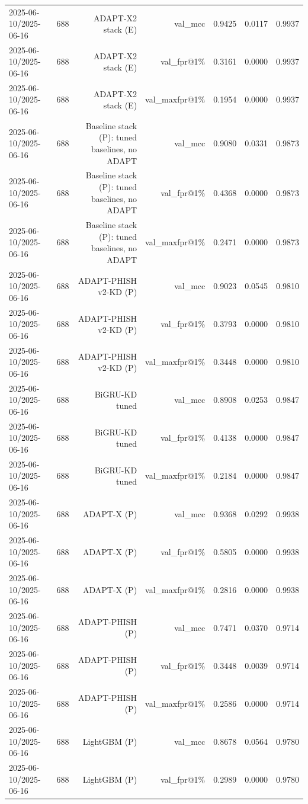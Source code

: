 \begin{table}[t]
\begin{tabular}{llrrrrr}
2025-06-10/2025-06-16 & 688 & ADAPT-X2 stack (E) & val\_mcc & 0.9425 & 0.0117 & 0.9937 \\
2025-06-10/2025-06-16 & 688 & ADAPT-X2 stack (E) & val\_fpr@1\% & 0.3161 & 0.0000 & 0.9937 \\
2025-06-10/2025-06-16 & 688 & ADAPT-X2 stack (E) & val\_maxfpr@1\% & 0.1954 & 0.0000 & 0.9937 \\
2025-06-10/2025-06-16 & 688 & Baseline stack (P): tuned baselines, no ADAPT & val\_mcc & 0.9080 & 0.0331 & 0.9873 \\
2025-06-10/2025-06-16 & 688 & Baseline stack (P): tuned baselines, no ADAPT & val\_fpr@1\% & 0.4368 & 0.0000 & 0.9873 \\
2025-06-10/2025-06-16 & 688 & Baseline stack (P): tuned baselines, no ADAPT & val\_maxfpr@1\% & 0.2471 & 0.0000 & 0.9873 \\
2025-06-10/2025-06-16 & 688 & ADAPT-PHISH v2-KD (P) & val\_mcc & 0.9023 & 0.0545 & 0.9810 \\
2025-06-10/2025-06-16 & 688 & ADAPT-PHISH v2-KD (P) & val\_fpr@1\% & 0.3793 & 0.0000 & 0.9810 \\
2025-06-10/2025-06-16 & 688 & ADAPT-PHISH v2-KD (P) & val\_maxfpr@1\% & 0.3448 & 0.0000 & 0.9810 \\
2025-06-10/2025-06-16 & 688 & BiGRU-KD tuned & val\_mcc & 0.8908 & 0.0253 & 0.9847 \\
2025-06-10/2025-06-16 & 688 & BiGRU-KD tuned & val\_fpr@1\% & 0.4138 & 0.0000 & 0.9847 \\
2025-06-10/2025-06-16 & 688 & BiGRU-KD tuned & val\_maxfpr@1\% & 0.2184 & 0.0000 & 0.9847 \\
2025-06-10/2025-06-16 & 688 & ADAPT-X (P) & val\_mcc & 0.9368 & 0.0292 & 0.9938 \\
2025-06-10/2025-06-16 & 688 & ADAPT-X (P) & val\_fpr@1\% & 0.5805 & 0.0000 & 0.9938 \\
2025-06-10/2025-06-16 & 688 & ADAPT-X (P) & val\_maxfpr@1\% & 0.2816 & 0.0000 & 0.9938 \\
2025-06-10/2025-06-16 & 688 & ADAPT-PHISH (P) & val\_mcc & 0.7471 & 0.0370 & 0.9714 \\
2025-06-10/2025-06-16 & 688 & ADAPT-PHISH (P) & val\_fpr@1\% & 0.3448 & 0.0039 & 0.9714 \\
2025-06-10/2025-06-16 & 688 & ADAPT-PHISH (P) & val\_maxfpr@1\% & 0.2586 & 0.0000 & 0.9714 \\
2025-06-10/2025-06-16 & 688 & LightGBM (P) & val\_mcc & 0.8678 & 0.0564 & 0.9780 \\
2025-06-10/2025-06-16 & 688 & LightGBM (P) & val\_fpr@1\% & 0.2989 & 0.0000 & 0.9780 \\

\end{tabular}
\end{table}
